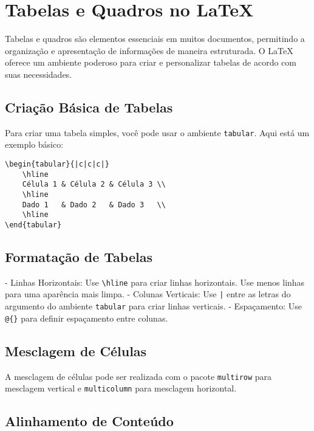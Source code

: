 \documentclass{article}
\begin{document}
\section{Tabelas e Quadros no \LaTeX}

Tabelas e quadros são elementos essenciais em muitos documentos, permitindo a organização e apresentação de informações de maneira estruturada. O LaTeX oferece um ambiente poderoso para criar e personalizar tabelas de acordo com suas necessidades.

\subsection{Criação Básica de Tabelas}

Para criar uma tabela simples, você pode usar o ambiente \texttt{tabular}. Aqui está um exemplo básico:

\begin{verbatim}
\begin{tabular}{|c|c|c|}
    \hline
    Célula 1 & Célula 2 & Célula 3 \\
    \hline
    Dado 1   & Dado 2   & Dado 3   \\
    \hline
\end{tabular}
\end{verbatim}

\subsection{Formatação de Tabelas}

- Linhas Horizontais: Use \texttt{\textbackslash hline} para criar linhas horizontais. Use menos linhas para uma aparência mais limpa.
- Colunas Verticais: Use \texttt{|} entre as letras do argumento do ambiente \texttt{tabular} para criar linhas verticais.
- Espaçamento: Use \texttt{@\{\}} para definir espaçamento entre colunas.

\subsection{Mesclagem de Células}

A mesclagem de células pode ser realizada com o pacote \texttt{multirow} para mesclagem vertical e \texttt{multicolumn} para mesclagem horizontal.

\subsection{Alinhamento de Conteúdo}
\end{document}
